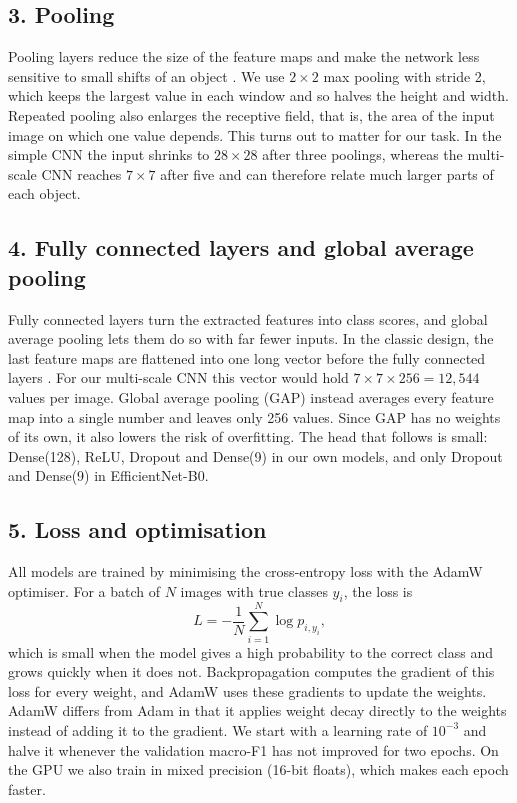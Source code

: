 \documentclass{article}
\begin{document}
\subsection{3. Pooling}

Pooling layers reduce the size of the feature maps and make the network less sensitive to small shifts of an object \cite{lec51}. We use $2\times2$ max pooling with stride 2, which keeps the largest value in each window and so halves the height and width. Repeated pooling also enlarges the receptive field, that is, the area of the input image on which one value depends. This turns out to matter for our task. In the simple CNN the input shrinks to $28\times28$ after three poolings, whereas the multi-scale CNN reaches $7\times7$ after five and can therefore relate much larger parts of each object.

\subsection{4. Fully connected layers and global average pooling}

Fully connected layers turn the extracted features into class scores, and global average pooling lets them do so with far fewer inputs. In the classic design, the last feature maps are flattened into one long vector before the fully connected layers \cite{lec51}. For our multi-scale CNN this vector would hold $7\times7\times256 = 12{,}544$ values per image. Global average pooling (GAP) instead averages every feature map into a single number and leaves only 256 values. Since GAP has no weights of its own, it also lowers the risk of overfitting. The head that follows is small: Dense(128), ReLU, Dropout and Dense(9) in our own models, and only Dropout and Dense(9) in EfficientNet-B0.

\subsection{5. Loss and optimisation}

All models are trained by minimising the cross-entropy loss with the AdamW optimiser. For a batch of $N$ images with true classes $y_i$, the loss is
\begin{equation}
  L = -\frac{1}{N}\sum_{i=1}^{N} \log p_{i,y_i} ,
\end{equation}
which is small when the model gives a high probability to the correct class and grows quickly when it does not. Backpropagation computes the gradient of this loss for every weight, and AdamW \cite{adamw} uses these gradients to update the weights. AdamW differs from Adam in that it applies weight decay directly to the weights instead of adding it to the gradient. We start with a learning rate of $10^{-3}$ and halve it whenever the validation macro-F1 has not improved for two epochs. On the GPU we also train in mixed precision (16-bit floats), which makes each epoch faster.
\end{document}
